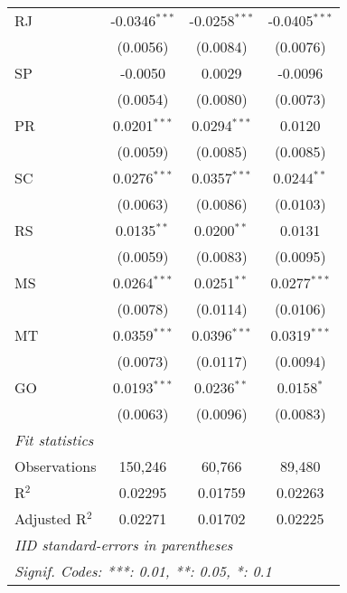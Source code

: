 \begin{tabular}{lccc}
   RJ              & -0.0346$^{***}$         & -0.0258$^{***}$         & -0.0405$^{***}$\\   
                   & (0.0056)                & (0.0084)                & (0.0076)\\   
   SP              & -0.0050                 & 0.0029                  & -0.0096\\   
                   & (0.0054)                & (0.0080)                & (0.0073)\\   
   PR              & 0.0201$^{***}$          & 0.0294$^{***}$          & 0.0120\\   
                   & (0.0059)                & (0.0085)                & (0.0085)\\   
   SC              & 0.0276$^{***}$          & 0.0357$^{***}$          & 0.0244$^{**}$\\   
                   & (0.0063)                & (0.0086)                & (0.0103)\\   
   RS              & 0.0135$^{**}$           & 0.0200$^{**}$           & 0.0131\\   
                   & (0.0059)                & (0.0083)                & (0.0095)\\   
   MS              & 0.0264$^{***}$          & 0.0251$^{**}$           & 0.0277$^{***}$\\   
                   & (0.0078)                & (0.0114)                & (0.0106)\\   
   MT              & 0.0359$^{***}$          & 0.0396$^{***}$          & 0.0319$^{***}$\\   
                   & (0.0073)                & (0.0117)                & (0.0094)\\   
   GO              & 0.0193$^{***}$          & 0.0236$^{**}$           & 0.0158$^{*}$\\   
                   & (0.0063)                & (0.0096)                & (0.0083)\\   
   \midrule
   \emph{Fit statistics}\\
   Observations    & 150,246                 & 60,766                  & 89,480\\  
   R$^2$           & 0.02295                 & 0.01759                 & 0.02263\\  
   Adjusted R$^2$  & 0.02271                 & 0.01702                 & 0.02225\\  
   \midrule \midrule
   \multicolumn{4}{l}{\emph{IID standard-errors in parentheses}}\\
   \multicolumn{4}{l}{\emph{Signif. Codes: ***: 0.01, **: 0.05, *: 0.1}}\\
\end{tabular}
\par\endgroup


